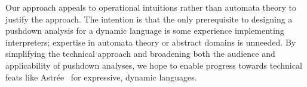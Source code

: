 Our approach appeals to operational intuitions rather than automata theory to justify the approach.
%
The intention is that the only prerequisite to designing a pushdown
analysis for a dynamic language is some experience implementing
interpreters; expertise in automata theory or abstract domains is
unneeded.
%
By simplifying the technical approach and broadening both the audience
and applicability of pushdown analyses, we hope to enable progress
towards technical feats like
Astr\'ee~\citep{ianjohnson:CousotEtAl-TASE07}
for expressive, dynamic languages.
%
